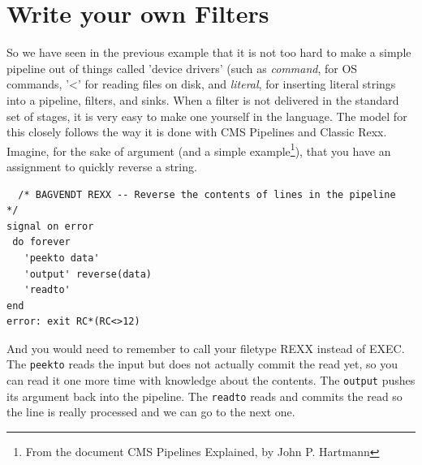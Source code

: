 \chapter{Write your own Filters}
So we have seen in the previous example that it is not too hard to
make a simple pipeline out of things called 'device drivers' (such as
\emph{command}, for OS commands, '<' for reading files on disk, and
\emph{literal}, for inserting literal strings into a pipeline,
filters, and sinks.
When a filter is not delivered in the standard set of stages, it is
very easy to make one yourself in the \nr{} language. The model for
this closely follows the way it is done with CMS Pipelines and Classic
Rexx.
Imagine, for the sake of argument (and a simple example\footnote{From
the document CMS Pipelines Explained, by John P. Hartmann}), that you have an
assignment to quickly reverse a string.
\begin{lstlisting}
  /* BAGVENDT REXX -- Reverse the contents of lines in the pipeline    */
signal on error
 do forever
   'peekto data'
   'output' reverse(data)
   'readto'
end
error: exit RC*(RC<>12)
\end{lstlisting}
And you would need to remember to call your filetype REXX instead of EXEC.  The \texttt{peekto} reads the input but does not actually commit the read yet, so you can read it one more time with knowledge about the contents. The \texttt{output} pushes its argument back into the pipeline. The \texttt{readto} reads and commits the read so the line is really processed and we can go to the next one.

